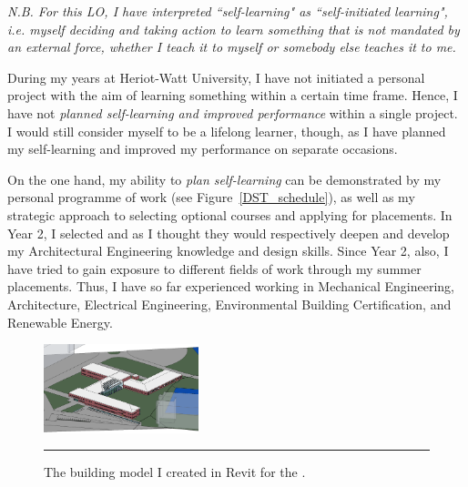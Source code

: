 \textit{N.B. For this LO, I have interpreted ``self-learning" as ``self-initiated learning", i.e. 
myself deciding and taking action to learn something that is not mandated by an external force,
whether I teach it to myself or somebody else teaches it to me.}

During my years at Heriot-Watt University, I have not initiated a personal project with the aim of learning something within a certain time frame.
Hence, I have not \emph{planned self-learning and improved performance} within a single project.
I would still consider myself to be a lifelong learner, though, as I have planned my self-learning and improved my performance on separate occasions.


On the one hand, my ability to \emph{plan self-learning} can be demonstrated by my personal programme of \DST \space work (see Figure~\ref{DST_schedule}), as well as my strategic approach to selecting optional courses and applying for placements.
In Year 2, I selected \HYD \space and \DPB \space as I thought they would respectively deepen and develop my Architectural Engineering knowledge and design skills.
Since Year 2, also, I have tried to gain exposure to different fields of work through my summer placements.
Thus, I have so far experienced working in Mechanical Engineering, Architecture, Electrical Engineering, Environmental Building Certification, and Renewable Energy.

\begin{figure}
	\centering
	\includegraphics[width=0.4\textwidth]{figures/South.PNG}
	\rule{0.4\textwidth}{0.5pt} %
	\caption{The building model I created in Revit for the \PRJTitle.}
	\label{fig:revit}
\end{figure}

